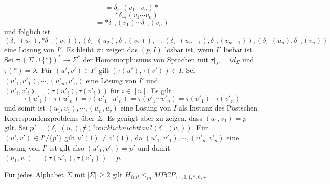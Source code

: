   \[= \delta_{\leftarrow}(v_1 \cdots v_n)*\] \[= *\delta_{\rightarrow}(v_1 \cdots v_n)\] \[=*\delta_{\rightarrow}(v_1) \cdots \delta_{\rightarrow}(v_n)\] und folglich ist \[(\delta_{\leftarrow}(u_1), *\delta_{\rightarrow}(v_1)), (\delta_{\leftarrow}(u_2), \delta_{\rightarrow}(v_2)), \cdots, (\delta_{\leftarrow}(u_{n-1}), \delta_{\rightarrow}(v_{n-1})), (\delta_{\leftarrow}(u_{n}), \delta_{\rightarrow}(v_{n}))\] eine Lösung von $I'$. Es bleibt zu zeigen das $(p, I)$ lösbar ist, wenn $I'$ lösbar ist. Sei $\tau : (\Sigma \cup \{*\})^* \rightarrow \Sigma^*$ der Homomorphismus von Sprachen mit $\tau \vert_{\Sigma} = id_{\Sigma}$ und $\tau(*) = \lambda$. Für $(u', v') \in I'$ gilt $(\tau (u'), \tau(v')) \in I$. Sei $(u'_1, v'_1), \cdots, (u'_n, v'_n)$ eine Lösung von $I'$ und $(u'_i, v'_i) = (\tau(u'_i), \tau(v'_i))$ für $i \in [n]$. Es gilt \[\tau(u'_1) \cdots \tau(u'_n) = \tau(u'_1 \cdots u'_n) = \tau(v'_1 \cdots v'_n) = \tau(v'_1) \cdots \tau(v'_n)\] und somit ist $(u_1, v_1), \cdots, (u_n, u_v)$ eine Lösung von $I$ als Instanz des Postschen Korrespondenzproblems über $\Sigma$. Es genügt aber zu zeigen, dass $(u_1, v_1) = p $ gilt. Sei $p' = (\delta_{\leftarrow} (u_1), \not \tau (?wirklich nicht tau?) \delta_{\rightarrow}(v_1))$. Für $(u', v') \in I' / \{p'\}$ gilt $u'(1) \not = v'(1)$, da $(u'_1, v'_1), \cdots, (u'_n, v'_n)$ eine Lösung von $I'$ ist gilt also $(u'_1, v'_1) = p'$ und damit $(u_1, v_1) = (\tau(u'_1), \tau(v'_1)) = p$.

  Für jedes Alphabet $\Sigma$ mit $|\Sigma| \geq 2$ gilt $H_{init} \leq_m MPCP_{\Box, 0, 1, *, 6, +}$

